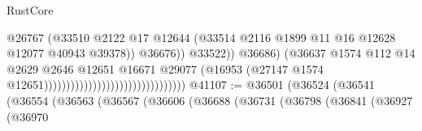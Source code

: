 \begin{lexlean}{RustCore}
\begin{coremodule}
                                                                        @26767
                                                                        (@33510
                                                                          @2122
                                                                          @17
                                                                          @12644
                                                                          (@33514
                                                                            @2116
                                                                            @1899
                                                                            @11
                                                                            @16
                                                                            @12628
                                                                            @12077
                                                                            @40943
                                                                            @39378))
                                                                        @36676))
                                                                    @33522))
                                                                @36686)
                                                              (@36637
                                                                @1574
                                                                @112
                                                                @14
                                                                @2629
                                                                @2646
                                                                @12651
                                                                @16671
                                                                @29077
                                                                (@16953
                                                                  (@27147
                                                                    @1574
                                                                    @12651))))))))))))))))))))))))))))))))
@41107 := @36501
    (@36524
      (@36541
        (@36554
          (@36563
            (@36567
              (@36606
                (@36688
                  (@36731
                    (@36798
                      (@36841
                        (@36927
                          (@36970

\end{coremodule}
\end{lexlean}
